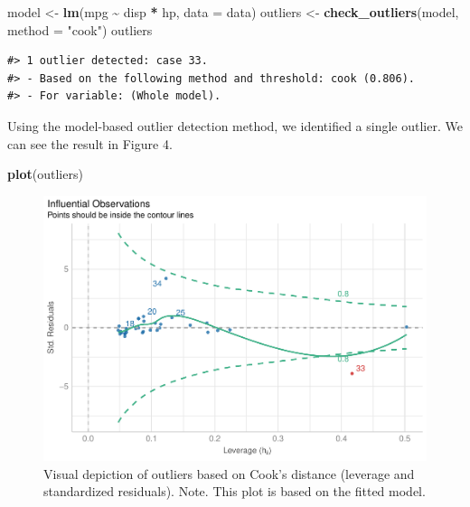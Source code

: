 \documentclass[sn-basic, lineno,pdflatex]{sn-jnl}
\newenvironment{Shaded}{\begin{snugshade}}{\end{snugshade}}
\newcommand{\AttributeTok}[1]{\textcolor[rgb]{0.13,0.29,0.53}{#1}}
\newcommand{\FunctionTok}[1]{\textcolor[rgb]{0.13,0.29,0.53}{\textbf{#1}}}
\newcommand{\NormalTok}[1]{#1}
\newcommand{\OtherTok}[1]{\textcolor[rgb]{0.56,0.35,0.01}{#1}}
\newcommand{\SpecialCharTok}[1]{\textcolor[rgb]{0.81,0.36,0.00}{\textbf{#1}}}
\newcommand{\StringTok}[1]{\textcolor[rgb]{0.31,0.60,0.02}{#1}}
\begin{document}
\begin{Shaded}
\begin{Highlighting}[]
\NormalTok{model }\OtherTok{\textless{}{-}} \FunctionTok{lm}\NormalTok{(mpg }\SpecialCharTok{\textasciitilde{}}\NormalTok{ disp }\SpecialCharTok{*}\NormalTok{ hp, }\AttributeTok{data =}\NormalTok{ data)}
\NormalTok{outliers }\OtherTok{\textless{}{-}} \FunctionTok{check\_outliers}\NormalTok{(model, }\AttributeTok{method =} \StringTok{"cook"}\NormalTok{)}
\NormalTok{outliers}
\end{Highlighting}
\end{Shaded}

\begin{verbatim}
#> 1 outlier detected: case 33.
#> - Based on the following method and threshold: cook (0.806).
#> - For variable: (Whole model).
\end{verbatim}

Using the model-based outlier detection method, we identified a single
outlier. We can see the result in Figure 4.

\begin{Shaded}
\begin{Highlighting}[]
\FunctionTok{plot}\NormalTok{(outliers)}
\end{Highlighting}
\end{Shaded}

\begin{figure}
\includegraphics[width=1\linewidth]{paper_files/figure-latex/model_fig-1} \caption{Visual depiction of outliers based on Cook’s distance (leverage and standardized residuals). Note. This plot is based on the fitted model.}\label{fig:model_fig}
\end{figure}
\end{document}
